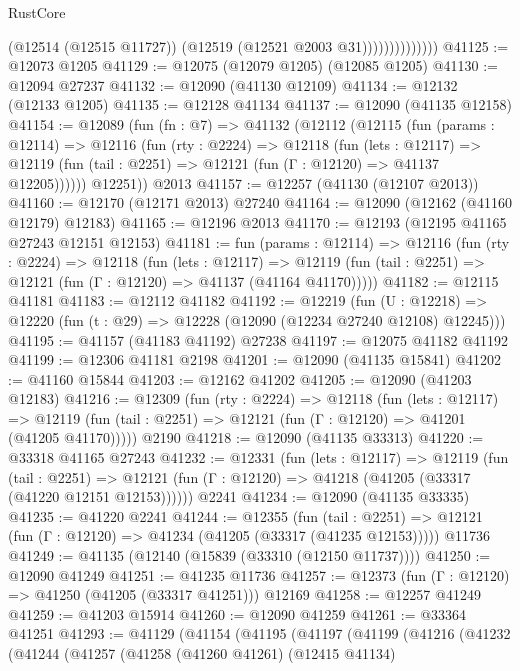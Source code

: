 \begin{lexlean}{RustCore}
\begin{coremodule}
                            (@12514 (@12515 @11727))
                            (@12519 (@12521 @2003 @31))))))))))))))
@41125 := @12073 @1205
@41129 := @12075 (@12079 @1205) (@12085 @1205)
@41130 := @12094 @27237
@41132 := @12090 (@41130 @12109)
@41134 := @12132 (@12133 @1205)
@41135 := @12128 @41134
@41137 := @12090 (@41135 @12158)
@41154 := @12089
    (fun (fn : @7) =>
    @41132
      (@12112
        (@12115
          (fun (params : @12114) =>
          @12116
            (fun (rty : @2224) =>
            @12118
              (fun (lets : @12117) =>
              @12119 (fun (tail : @2251) => @12121 (fun (Γ : @12120) => @41137 @12205))))))
        @12251))
    @2013
@41157 := @12257 (@41130 (@12107 @2013))
@41160 := @12170 (@12171 @2013) @27240
@41164 := @12090 (@12162 (@41160 @12179) @12183)
@41165 := @12196 @2013
@41170 := @12193 (@12195 @41165 @27243 @12151 @12153)
@41181 := fun (params : @12114) =>
  @12116
    (fun (rty : @2224) =>
    @12118
      (fun (lets : @12117) =>
      @12119 (fun (tail : @2251) => @12121 (fun (Γ : @12120) => @41137 (@41164 @41170)))))
@41182 := @12115 @41181
@41183 := @12112 @41182
@41192 := @12219
    (fun (U : @12218) => @12220 (fun (t : @29) => @12228 (@12090 (@12234 @27240 @12108) @12245)))
@41195 := @41157 (@41183 @41192) @27238
@41197 := @12075 @41182 @41192
@41199 := @12306 @41181 @2198
@41201 := @12090 (@41135 @15841)
@41202 := @41160 @15844
@41203 := @12162 @41202
@41205 := @12090 (@41203 @12183)
@41216 := @12309
    (fun (rty : @2224) =>
    @12118
      (fun (lets : @12117) =>
      @12119 (fun (tail : @2251) => @12121 (fun (Γ : @12120) => @41201 (@41205 @41170)))))
    @2190
@41218 := @12090 (@41135 @33313)
@41220 := @33318 @41165 @27243
@41232 := @12331
    (fun (lets : @12117) =>
    @12119
      (fun (tail : @2251) =>
      @12121 (fun (Γ : @12120) => @41218 (@41205 (@33317 (@41220 @12151 @12153))))))
    @2241
@41234 := @12090 (@41135 @33335)
@41235 := @41220 @2241
@41244 := @12355
    (fun (tail : @2251) => @12121 (fun (Γ : @12120) => @41234 (@41205 (@33317 (@41235 @12153)))))
    @11736
@41249 := @41135 (@12140 (@15839 (@33310 (@12150 @11737))))
@41250 := @12090 @41249
@41251 := @41235 @11736
@41257 := @12373 (fun (Γ : @12120) => @41250 (@41205 (@33317 @41251))) @12169
@41258 := @12257 @41249
@41259 := @41203 @15914
@41260 := @12090 @41259
@41261 := @33364 @41251
@41293 := @41129
    (@41154
      (@41195
        (@41197
          (@41199
            (@41216
              (@41232
                (@41244
                  (@41257
                    (@41258
                      (@41260 @41261)
                      (@12415 @41134)

\end{coremodule}
\end{lexlean}
